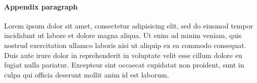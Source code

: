 \documentclass[accepted]{melba}
\begin{document}
			\paragraph{Appendix paragraph} Lorem ipsum dolor sit amet, consectetur adipisicing elit, sed do eiusmod
			tempor incididunt ut labore et dolore magna aliqua. Ut enim ad minim veniam,
			quis nostrud exercitation ullamco laboris nisi ut aliquip ex ea commodo
			consequat. Duis aute irure dolor in reprehenderit in voluptate velit esse
			cillum dolore eu fugiat nulla pariatur. Excepteur sint occaecat cupidatat non
			proident, sunt in culpa qui officia deserunt mollit anim id est laborum.
\end{document}
